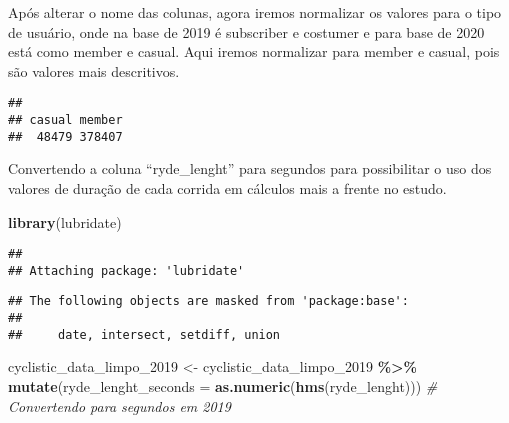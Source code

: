 \documentclass[
]{article}
\newenvironment{Shaded}{\begin{snugshade}}{\end{snugshade}}
\newcommand{\AttributeTok}[1]{\textcolor[rgb]{0.13,0.29,0.53}{#1}}
\newcommand{\CommentTok}[1]{\textcolor[rgb]{0.56,0.35,0.01}{\textit{#1}}}
\newcommand{\FunctionTok}[1]{\textcolor[rgb]{0.13,0.29,0.53}{\textbf{#1}}}
\newcommand{\NormalTok}[1]{#1}
\newcommand{\OtherTok}[1]{\textcolor[rgb]{0.56,0.35,0.01}{#1}}
\newcommand{\SpecialCharTok}[1]{\textcolor[rgb]{0.81,0.36,0.00}{\textbf{#1}}}
\newcommand{\StringTok}[1]{\textcolor[rgb]{0.31,0.60,0.02}{#1}}
\begin{document}
Após alterar o nome das colunas, agora iremos normalizar os valores para
o tipo de usuário, onde na base de 2019 é subscriber e costumer e para
base de 2020 está como member e casual. Aqui iremos normalizar para
member e casual, pois são valores mais descritivos.

\begin{Shaded}
\end{Shaded}

\begin{verbatim}
## 
## casual member 
##  48479 378407
\end{verbatim}

Convertendo a coluna ``ryde\_lenght'' para segundos para possibilitar o
uso dos valores de duração de cada corrida em cálculos mais a frente no
estudo.

\begin{Shaded}
\begin{Highlighting}[]
\FunctionTok{library}\NormalTok{(lubridate)}
\end{Highlighting}
\end{Shaded}

\begin{verbatim}
## 
## Attaching package: 'lubridate'
\end{verbatim}

\begin{verbatim}
## The following objects are masked from 'package:base':
## 
##     date, intersect, setdiff, union
\end{verbatim}

\begin{Shaded}
\begin{Highlighting}[]
\NormalTok{cyclistic\_data\_limpo\_2019 }\OtherTok{\textless{}{-}}\NormalTok{ cyclistic\_data\_limpo\_2019 }\SpecialCharTok{\%\textgreater{}\%}
  \FunctionTok{mutate}\NormalTok{(}\AttributeTok{ryde\_lenght\_seconds =} \FunctionTok{as.numeric}\NormalTok{(}\FunctionTok{hms}\NormalTok{(ryde\_lenght)))  }\CommentTok{\# Convertendo para segundos em 2019}
\end{Highlighting}
\end{Shaded}
\end{document}
